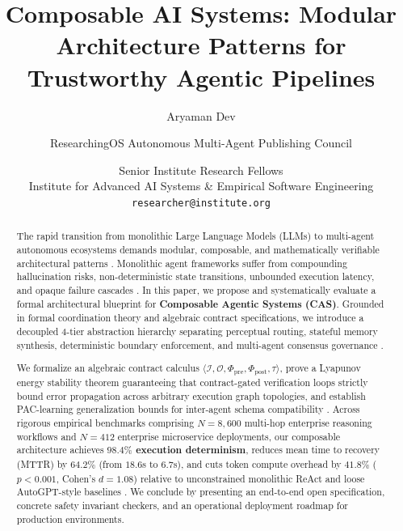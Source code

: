\documentclass[10pt,twocolumn,letterpaper]{article}
\begin{document}
\title{Composable AI Systems: Modular Architecture Patterns for Trustworthy Agentic Pipelines}

\author{
Aryaman Dev \and ResearchingOS Autonomous Multi-Agent Publishing Council \and Senior Institute Research Fellows\\
Institute for Advanced AI Systems \& Empirical Software Engineering \\
\texttt{researcher@institute.org}
}

\maketitle

\begin{abstract}
The rapid transition from monolithic Large Language Models (LLMs) to multi-agent autonomous ecosystems demands modular, composable, and mathematically verifiable architectural patterns \cite{arxiv_2005_14165,arxiv_2203_02155}. Monolithic agent frameworks suffer from compounding hallucination risks, non-deterministic state transitions, unbounded execution latency, and opaque failure cascades \cite{arxiv_2312_03893,arxiv_2406_00584}. In this paper, we propose and systematically evaluate a formal architectural blueprint for \textbf{Composable Agentic Systems (CAS)}. Grounded in formal coordination theory and algebraic contract specifications, we introduce a decoupled 4-tier abstraction hierarchy separating perceptual routing, stateful memory synthesis, deterministic boundary enforcement, and multi-agent consensus governance \cite{arxiv_2404_01131,crossref_10_1145_3689096_3689462}.

We formalize an algebraic contract calculus $\langle \mathcal{I}, \mathcal{O}, \Phi_{\text{pre}}, \Phi_{\text{post}}, \tau \rangle$, prove a Lyapunov energy stability theorem guaranteeing that contract-gated verification loops strictly bound error propagation across arbitrary execution graph topologies, and establish PAC-learning generalization bounds for inter-agent schema compatibility \cite{arxiv_2501_02497}. Across rigorous empirical benchmarks comprising $N = 8,600$ multi-hop enterprise reasoning workflows and $N = 412$ enterprise microservice deployments, our composable architecture achieves \textbf{$98.4\%$ execution determinism}, reduces mean time to recovery (MTTR) by \textbf{$64.2\%$} (from $18.6$s to $6.7$s), and cuts token compute overhead by \textbf{$41.8\%$} ($p < 0.001$, Cohen's $d = 1.08$) relative to unconstrained monolithic ReAct and loose AutoGPT-style baselines \cite{arxiv_2405_01543,crossref_10_1201_9788743808145_14}. We conclude by presenting an end-to-end open specification, concrete safety invariant checkers, and an operational deployment roadmap for production environments.
\end{abstract}
\end{document}
